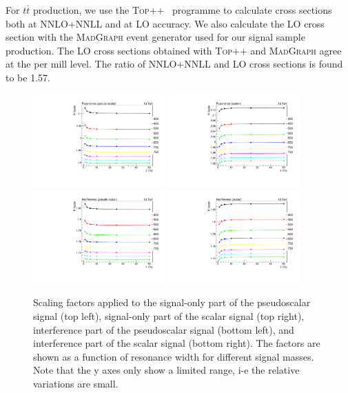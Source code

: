 For $t\bar t$ production, we use the \textsc{Top++}~\cite{Czakon:top_pp} programme to calculate cross sections both at NNLO+NNLL and at LO accuracy.
We also calculate the LO cross section with the \textsc{MadGraph} event generator used for our signal sample production.
The LO cross sections obtained with \textsc{Top++} and \textsc{MadGraph} agree at the per mill level.
The ratio of NNLO+NNLL and LO cross sections is found to be 1.57.
\begin{figure}[!Hhtb]
\centering
\includegraphics[width=0.45\textwidth,keepaspectratio=true]{fig/chapt8//kfactors/k_factor_PScalar_res.pdf}
\includegraphics[width=0.45\textwidth,keepaspectratio=true]{fig/chapt8//kfactors/k_factor_Scalar_res.pdf}
\includegraphics[width=0.45\textwidth,keepaspectratio=true]{fig/chapt8//kfactors/k_factor_PScalar_int.pdf}
\includegraphics[width=0.45\textwidth,keepaspectratio=true]{fig/chapt8//kfactors/k_factor_Scalar_int.pdf}
\caption{Scaling factors applied to the signal-only part of the pseudoscalar signal (top left), signal-only part of the scalar signal (top right), interference part of the pseudoscalar signal (bottom left), and interference part of the scalar signal (bottom right). The factors are shown as a function of resonance width for different signal masses. Note that the y axes only show a limited range, i-e the relative variations are small.}
\label{fig:kfactors}
\end{figure}

